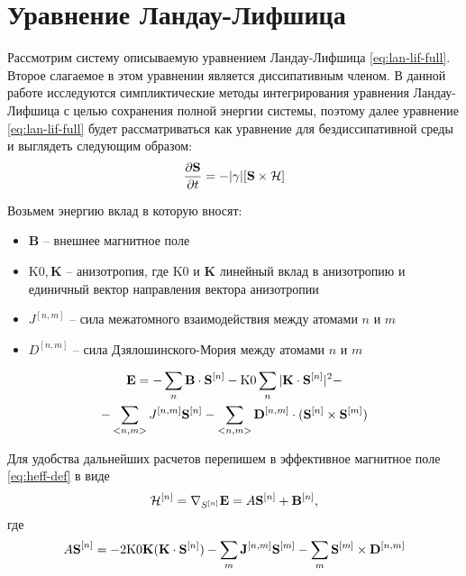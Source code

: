 \section{Уравнение Ландау-Лифшица}
Рассмотрим систему описываемую уравнением Ландау-Лифшица \ref{eq:lan-lif-full}.
Второе слагаемое в этом уравнении является диссипативным членом.
В данной работе исследуются симпликтические методы интегрирования уравнения
Ландау-Лифшица с целью сохранения полной энергии системы, поэтому далее
уравнение \ref{eq:lan-lif-full} будет рассматриваться как уравнение для
бездиссипативной среды и выглядеть следующим образом:
\begin{equation}\label{eq:lan-lif}
	\frac{\partial \mathbf S}{\partial t} = - |\gamma|[\mathbf S\times \mathcal{H}]
\end{equation}

Возьмем энергию вклад в которую вносят:
\begin{itemize}
    \item $\mathbf B$ -- внешнее магнитное поле
    \item $\mathrm{K0}, \mathbf K$ -- анизотропия, где $\mathrm{K0}$ и $\mathbf
        K$ линейный вклад в анизотропию и единичный вектор направления вектора
        анизотропии
    \item $J^{[n,m]}$ -- сила межатомного взаимодействия между атомами $n$ и
        $m$
    \item $D^{[n,m]}$ -- сила Дзялошинского-Мория между атомами $n$ и $m$
\end{itemize}
\begin{multline}
    \mathbf E = -\sum_n \mathbf B \cdot \mathbf{S}^{[n]} - \mathrm{K0} \sum_n |\mathbf K \cdot
    \mathbf{S}^{[n]} |^2
    -\\-
    \sum_{<n,m>} J^{[n,m]} \mathbf{S}^{[n]} - \sum_{<n,m>} \mathbf D^{[n,m]}\cdot
    (\mathbf{S}^{[n]} \times \mathbf S^{[m]})
\end{multline}

Для удобства дальнейших расчетов перепишем в эффективное магнитное поле
\ref{eq:heff-def} в виде
\begin{equation}
    \mathcal{H}^{[n]} = \nabla_{S^{[n]}}\mathbf{E} = A\mathbf{S}^{[n]} + \mathbf
    B^{[n]},\label{eq:heff}
\end{equation}
где
\begin{equation}
    A\textbf S^{[n]} = -2\mathrm{K0} \mathbf{K} (\mathbf{K}\cdot \mathbf{S}^{[n]}) -
    \sum_m \mathbf J^{[n, m]} \mathbf S^{[m]} - \sum_m \mathbf S^{[m]} \times
    \mathbf{D}^{[n,m]}
\end{equation}

